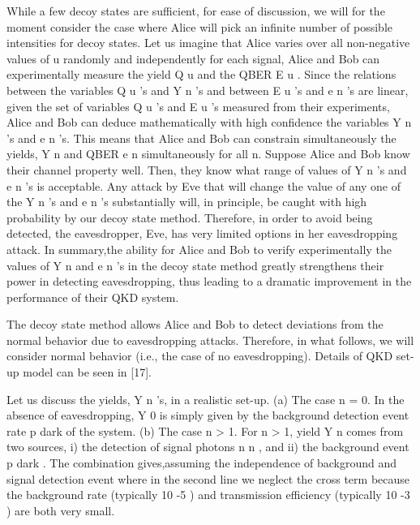 While a few decoy states are sufficient, for ease of discussion, we will for the moment consider the case where Alice will pick an infinite number of possible intensities for decoy states. Let us imagine that Alice varies over all non-negative values of u randomly and independently for each signal, Alice and Bob can experimentally measure the yield Q u and the QBER E u . Since the relations between the variables Q u ’s and Y n ’s and between E u ’s and e n ’s are linear, given the set of variables Q u ’s and E u ’s measured from their experiments, Alice and Bob can deduce mathematically with high confidence the variables Y n ’s and e n ’s. This means that Alice and Bob can constrain simultaneously the yields, Y n and QBER e n simultaneously for all n. Suppose Alice and Bob know their channel property well. Then, they know what range of values of Y n ’s and e n ’s is acceptable. Any attack by Eve that will change the value of any one of the Y n ’s and e n ’s substantially will, in principle, be caught with high probability by our decoy state method. Therefore, in order to avoid being detected, the eavesdropper, Eve, has very limited options in her eavesdropping attack. In summary,the ability for Alice and Bob to verify experimentally the values of Y n and e n ’s in the decoy state method greatly strengthens their power in detecting eavesdropping, thus leading to a dramatic improvement in the performance of their QKD system.

The decoy state method allows Alice and Bob to detect deviations from the normal behavior due to eavesdropping attacks. Therefore, in what follows, we will consider normal behavior (i.e., the case of no eavesdropping). Details of QKD set-up model can be seen in [17].

Let us discuss the yields, Y n ’s, in a realistic set-up.
(a) The case n = 0.
In the absence of eavesdropping, Y 0 is simply given by the background detection event rate p dark of the system.
(b) The case n > 1. For n > 1, yield Y n comes from two sources, i) the detection of signal photons n n , and ii) the background event p dark . The combination gives,assuming the independence of background and signal detection event where in the second line we neglect the cross term because the background rate (typically 10 -5 ) and transmission efficiency (typically 10 -3 ) are both very small.

